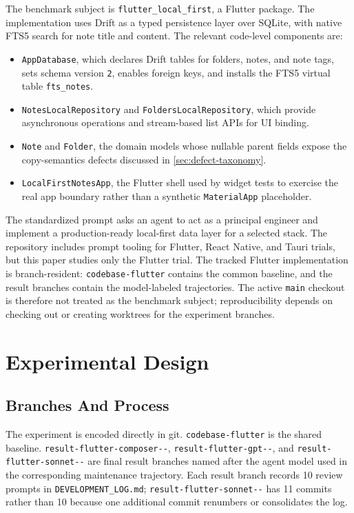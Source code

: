 \documentclass[11pt]{article}
\newcommand{\BaseBranch}{\texttt{codebase-\allowbreak flutter}}
\newcommand{\ComposerBranch}{\texttt{result-\allowbreak flutter-\allowbreak composer-\allowbreak 2-\allowbreak 0}}
\newcommand{\GPTBranch}{\texttt{result-\allowbreak flutter-\allowbreak gpt-\allowbreak 5-\allowbreak 5}}
\newcommand{\SonnetBranch}{\texttt{result-\allowbreak flutter-\allowbreak sonnet-\allowbreak 4-\allowbreak 6}}
\newcommand{\AppPath}{\texttt{flutter\_local\_first}}
\newcommand{\DevLog}{\texttt{DEVELOPMENT\_LOG.md}}
\newcommand{\RepeatedPrompts}{10}
\newcommand{\SonnetCommits}{11}
\begin{document}
The benchmark subject is \AppPath{}, a Flutter package. The implementation uses Drift as a typed persistence layer over SQLite, with native FTS5 search for note title and content. The relevant code-level components are:

\begin{itemize}
  \item \texttt{AppDatabase}, which declares Drift tables for folders, notes, and note tags, sets schema version \texttt{2}, enables foreign keys, and installs the FTS5 virtual table \texttt{fts\_notes}.
  \item \texttt{NotesLocalRepository} and \texttt{FoldersLocalRepository}, which provide asynchronous operations and stream-based list APIs for UI binding.
  \item \texttt{Note} and \texttt{Folder}, the domain models whose nullable parent fields expose the copy-semantics defects discussed in \cref{sec:defect-taxonomy}.
  \item \texttt{LocalFirstNotesApp}, the Flutter shell used by widget tests to exercise the real app boundary rather than a synthetic \texttt{MaterialApp} placeholder.
\end{itemize}

The standardized prompt asks an agent to act as a principal engineer and implement a production-ready local-first data layer for a selected stack. The repository includes prompt tooling for Flutter, React Native, and Tauri trials, but this paper studies only the Flutter trial. The tracked Flutter implementation is branch-resident: \BaseBranch{} contains the common baseline, and the result branches contain the model-labeled trajectories. The active \texttt{main} checkout is therefore not treated as the benchmark subject; reproducibility depends on checking out or creating worktrees for the experiment branches.

\section{Experimental Design}
\label{sec:experimental-design}

\subsection{Branches And Process}
\label{sec:branches}

The experiment is encoded directly in git. \BaseBranch{} is the shared baseline. \ComposerBranch{}, \GPTBranch{}, and \SonnetBranch{} are final result branches named after the agent model used in the corresponding maintenance trajectory. Each result branch records \RepeatedPrompts{} review prompts in \DevLog{}; \SonnetBranch{} has \SonnetCommits{} commits rather than \RepeatedPrompts{} because one additional commit renumbers or consolidates the log.
\end{document}
